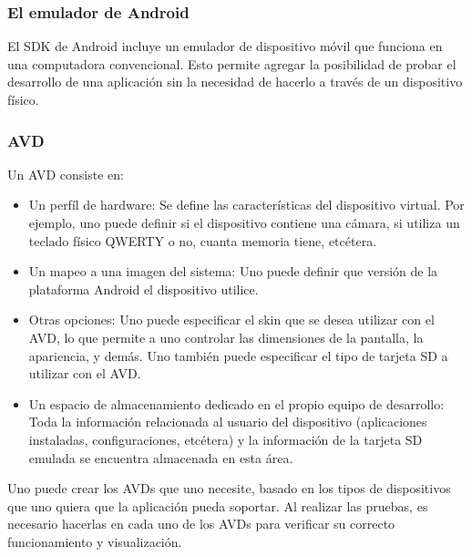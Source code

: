 \subsubsection{El emulador de Android}
\label{subsubsec:android.tools.emulator.1}

El \ac{SDK} de Android incluye un emulador de dispositivo m\'ovil que funciona en una computadora convencional. Esto permite agregar la posibilidad de probar el desarrollo de una aplicaci\'on sin la necesidad de hacerlo a trav\'es de un dispositivo f\'isico.~\cite{and.dev.emulator}

\subsubsection{\acf{AVD}}
\label{subsubsec:android.tools.avd.1}

Un \ac{AVD} consiste en:

\begin{itemize}
\item Un perf\'il de hardware: Se define las caracter\'isticas del dispositivo virtual. Por ejemplo, uno puede definir si el dispositivo contiene una c\'amara, si utiliza un teclado f\'isico QWERTY o no, cuanta memoria tiene, etc\'etera.

\item Un mapeo a una imagen del sistema: Uno puede definir que versi\'on de la plataforma Android el dispositivo utilice. 

\item Otras opciones: Uno puede especificar el skin que se desea utilizar con el \ac{AVD}, lo que permite a uno controlar las dimensiones de la pantalla, la apariencia, y dem\'as. Uno tambi\'en puede especificar el tipo de tarjeta \ac{SD} a utilizar con el \ac{AVD}.

\item Un espacio de almacenamiento dedicado en el propio equipo de desarrollo: Toda la informaci\'on relacionada al usuario del dispositivo (aplicaciones instaladas, configuraciones, etc\'etera) y la informaci\'on de la tarjeta \ac{SD} emulada se encuentra almacenada en esta \'area.
\end{itemize}

Uno puede crear los \ac{AVD}s que uno necesite, basado en los tipos de dispositivos que uno quiera que la aplicaci\'on pueda soportar. Al realizar las pruebas, es necesario hacerlas en cada uno de los \ac{AVD}s para verificar su correcto funcionamiento y visualizaci\'on.~\cite{and.dev.avd}
